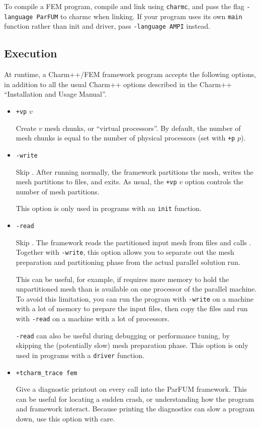 To compile a FEM program, compile and link using {\tt charmc}, and pass the flag {\tt -language ParFUM} to charmc when linking. If your program uses its own {\tt main} function rather than init and driver, pass {\tt -language AMPI} instead.

\subsection{Execution}

At runtime, a Charm++/FEM framework program accepts the following
options, in addition to all the usual Charm++ options described in 
the Charm++ ``Installation and Usage Manual''.

\begin{itemize}

\item {\tt +vp} $v$  

Create $v$ mesh chunks, or ``virtual processors''.
By default, the number of mesh chunks is equal to the number of 
physical processors (set with {\tt +p} $p$).


\item {\tt -write}

Skip .
After running  normally, the framework partitions the mesh, 
writes the mesh partitions to files, and exits.  As usual, the
{\tt +vp} $v$ option controls the number of mesh partitions.

This option is only used in programs with an {\tt init} function.

\item {\tt -read}

Skip .
The framework reads the partitioned input mesh from files
and calls .  Together with {\tt -write}, this option
allows you to separate out the mesh preparation and partitioning 
phase from the actual parallel solution run.

This can be useful, for example, if  requires more memory 
to hold the unpartitioned mesh than is available on one processor of 
the parallel machine.  To avoid this limitation, you can run the program
with {\tt -write} on a machine with a lot of memory to prepare the input
files, then copy the files and run with {\tt -read} on a machine with 
a lot of processors.

{\tt -read} can also be useful during debugging or performance tuning, 
by skipping the (potentially slow) mesh preparation phase.
This option is only used in programs with a {\tt driver} function.

\item {\tt +tcharm\_trace fem}

Give a diagnostic printout on every call into the ParFUM framework.
This can be useful for locating a sudden crash, or understanding
how the program and framework interact.  Because printing the 
diagnostics can slow a program down, use this option with care.

\end{itemize}